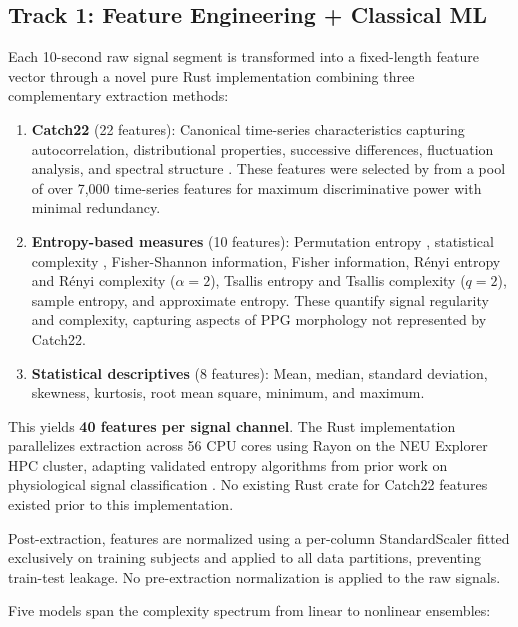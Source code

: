\documentclass[11pt]{article}
\begin{document}
\subsection{Track 1: Feature Engineering + Classical ML}
\label{sec:track1}

Each 10-second raw signal segment is transformed into a fixed-length feature vector through a novel pure Rust implementation combining three complementary extraction methods:

\begin{enumerate}[nosep]
    \item \textbf{Catch22} (22 features): Canonical time-series characteristics capturing autocorrelation, distributional properties, successive differences, fluctuation analysis, and spectral structure \citep{lubba2019catch22}. These features were selected by \citeauthor{lubba2019catch22} from a pool of over 7,000 time-series features for maximum discriminative power with minimal redundancy.
    \item \textbf{Entropy-based measures} (10 features): Permutation entropy \citep{bandt2002permutation}, statistical complexity \citep{rosso2007distinguishing}, Fisher-Shannon information, Fisher information, R\'{e}nyi entropy and R\'{e}nyi complexity ($\alpha = 2$), Tsallis entropy and Tsallis complexity ($q = 2$), sample entropy, and approximate entropy. These quantify signal regularity and complexity, capturing aspects of PPG morphology not represented by Catch22.
    \item \textbf{Statistical descriptives} (8 features): Mean, median, standard deviation, skewness, kurtosis, root mean square, minimum, and maximum.
\end{enumerate}

This yields \textbf{40 features per signal channel}. The Rust implementation parallelizes extraction across 56 CPU cores using Rayon on the NEU Explorer HPC cluster, adapting validated entropy algorithms from prior work on physiological signal classification \citep{boda2025ai4pain}. No existing Rust crate for Catch22 features existed prior to this implementation.

Post-extraction, features are normalized using a per-column StandardScaler fitted exclusively on training subjects and applied to all data partitions, preventing train-test leakage. No pre-extraction normalization is applied to the raw signals.

Five models span the complexity spectrum from linear to nonlinear ensembles:
\end{document}
